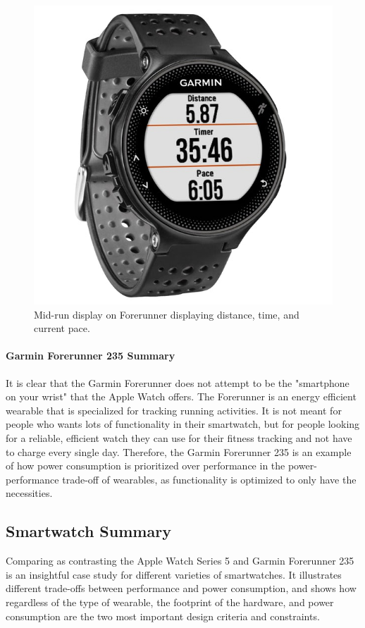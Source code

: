 \begin{figure}[h]
    \centering
    \includegraphics[scale=0.25]{media/garmin_running.jpg}
    \caption{Mid-run display on Forerunner displaying distance, time, and current pace.}
    \label{fig:garm_disp}
\end{figure}

\paragraph{Garmin Forerunner 235 Summary}
It is clear that the Garmin Forerunner does not attempt to be the "smartphone on your wrist" that the Apple
Watch offers. The Forerunner is an energy efficient wearable that is specialized for tracking running
activities. It is not meant for people who wants lots of functionality in their smartwatch, but for people
looking for a reliable, efficient watch they can use for their fitness tracking and not have to charge every
single day. Therefore, the Garmin Forerunner 235 is an example of how power consumption is prioritized over
performance in the power-performance trade-off of wearables, as functionality is optimized to only have the
necessities.

\subsection{Smartwatch Summary}
Comparing as contrasting the Apple Watch Series 5 and Garmin Forerunner 235 is an insightful case study
for different varieties of smartwatches. It illustrates different trade-offs between performance and
power consumption, and shows how regardless of the type of wearable, the footprint of the hardware, and
power consumption are the two most important design criteria and constraints.